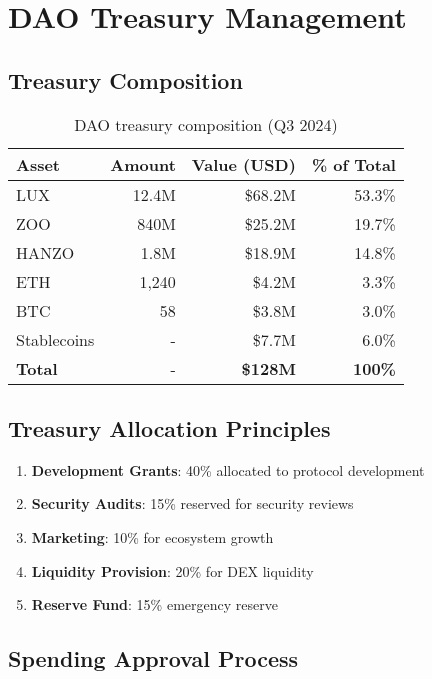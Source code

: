 \documentclass[11pt,a4paper]{article}
\begin{document}
\section{DAO Treasury Management}

\subsection{Treasury Composition}

\begin{table}[h]
\centering
\begin{tabular}{@{}lrrr@{}}
\toprule
\textbf{Asset} & \textbf{Amount} & \textbf{Value (USD)} & \textbf{\% of Total} \\ \midrule
LUX & 12.4M & \$68.2M & 53.3\% \\
ZOO & 840M & \$25.2M & 19.7\% \\
HANZO & 1.8M & \$18.9M & 14.8\% \\
ETH & 1,240 & \$4.2M & 3.3\% \\
BTC & 58 & \$3.8M & 3.0\% \\
Stablecoins & - & \$7.7M & 6.0\% \\ \midrule
\textbf{Total} & - & \textbf{\$128M} & \textbf{100\%} \\ \bottomrule
\end{tabular}
\caption{DAO treasury composition (Q3 2024)}
\end{table}

\subsection{Treasury Allocation Principles}

\begin{enumerate}
\item \textbf{Development Grants}: 40\% allocated to protocol development
\item \textbf{Security Audits}: 15\% reserved for security reviews
\item \textbf{Marketing}: 10\% for ecosystem growth
\item \textbf{Liquidity Provision}: 20\% for DEX liquidity
\item \textbf{Reserve Fund}: 15\% emergency reserve
\end{enumerate}

\subsection{Spending Approval Process}
\end{document}
